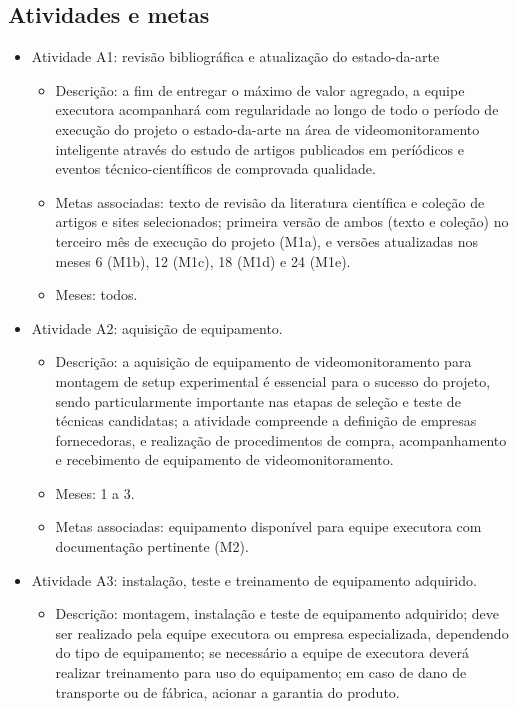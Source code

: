 \subsection{Atividades e metas}
\begin{itemize}
	\item Atividade A1: revisão bibliográfica e atualização do estado-da-arte
	\begin{itemize}
		\item Descrição: a fim de entregar o máximo de valor agregado, a equipe executora acompanhará com regularidade ao longo de todo o período de execução do projeto o estado-da-arte na área de videomonitoramento inteligente através do estudo de artigos publicados em períódicos e eventos técnico-científicos de comprovada qualidade.
		\item Metas associadas: texto de revisão da literatura científica e coleção de artigos e sites selecionados; primeira versão de ambos (texto e coleção) no terceiro mês de execução do projeto (M1a), e versões atualizadas nos meses 6 (M1b), 12 (M1c), 18 (M1d) e 24 (M1e).
		\item Meses: todos.
	\end{itemize}
	\item Atividade A2: aquisição de equipamento.
	\begin{itemize}
		\item Descrição: a aquisição de equipamento de videomonitoramento para montagem de setup experimental é essencial para o sucesso do projeto, sendo particularmente importante nas etapas de seleção e teste de técnicas candidatas; a atividade compreende a definição de empresas fornecedoras, e realização de procedimentos de compra, acompanhamento e recebimento de equipamento de videomonitoramento. 
		\item Meses: 1 a 3.
		\item Metas associadas: equipamento disponível para equipe executora com documentação pertinente (M2).
	\end{itemize}
	\item Atividade A3: instalação, teste e treinamento de equipamento adquirido.
	\begin{itemize}
		\item Descrição: montagem, instalação e teste de equipamento adquirido; deve ser realizado pela equipe executora ou empresa especializada, dependendo do tipo de equipamento; se necessário a equipe de executora deverá realizar treinamento para uso do equipamento; em caso de dano de transporte ou de fábrica, acionar a garantia do produto.

\end{itemize}
\end{itemize}
